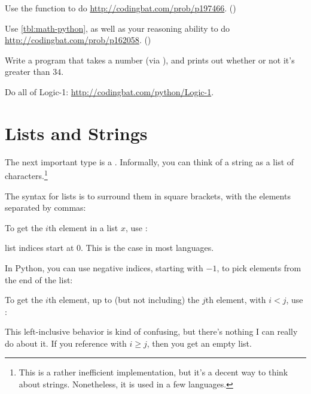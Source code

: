 \begin{exercise}
  Use the  function to do
  \url{http://codingbat.com/prob/p197466}. ()
\end{exercise}

\begin{exercise}
  Use \cref{tbl:math-python}, as well as your reasoning ability to do
  \url{http://codingbat.com/prob/p162058}. ()
\end{exercise}

\begin{exercise}
  Write a program that takes a number (via ), and prints
  out whether or not it's greater than $34$.
\end{exercise}


\begin{exercise}
  Do all of Logic-1: \url{http://codingbat.com/python/Logic-1}.
\end{exercise}

\section{Lists and Strings}

The next important type is a . Informally, you can think of
a string as a list of characters.\footnote{This is a rather
  inefficient implementation, but it's a decent way to think about
  strings. Nonetheless, it is used in a few languages.}

The syntax for lists is to surround them in square brackets, with the
elements separated by commas:


To get the $i$th element in a list $x$, use :


 list indices start at $0$. This is the case in most
languages.

In Python, you can use negative indices, starting with $-1$, to pick
elements from the end of the list:


To get the $i$th element, up to (but not including) the $j$th element,
with $i < j$, use :


This left-inclusive behavior is kind of confusing, but there's nothing
I can really do about it. If you reference  with
$i \ge j$, then you get an empty list.


